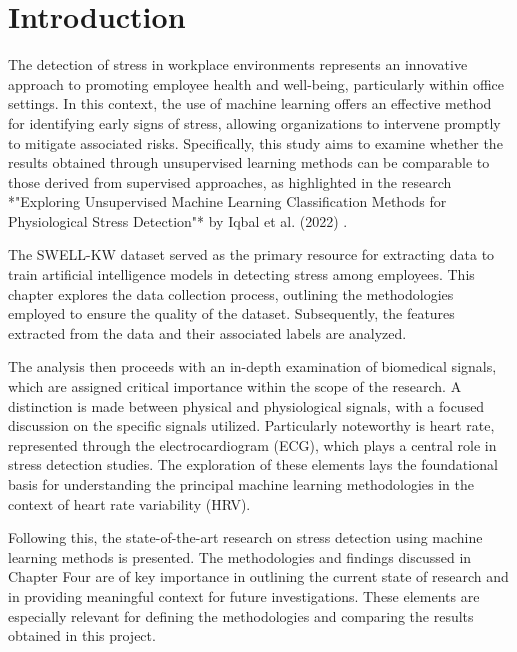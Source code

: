 \chapter{Introduction}

The detection of stress in workplace environments represents an innovative approach to promoting employee health and well-being, particularly within office settings. In this context, the use of machine learning offers an effective method for identifying early signs of stress, allowing organizations to intervene promptly to mitigate associated risks. Specifically, this study aims to examine whether the results obtained through unsupervised learning methods can be comparable to those derived from supervised approaches, as highlighted in the research *"Exploring Unsupervised Machine Learning Classification Methods for Physiological Stress Detection"* by Iqbal et al. (2022) \cite{iqbal2022exploring}.

\vspace{0.5cm}

The SWELL-KW dataset served as the primary resource for extracting data to train artificial intelligence models in detecting stress among employees. This chapter explores the data collection process, outlining the methodologies employed to ensure the quality of the dataset. Subsequently, the features extracted from the data and their associated labels are analyzed.

\vspace{0.5cm}

The analysis then proceeds with an in-depth examination of biomedical signals, which are assigned critical importance within the scope of the research. A distinction is made between physical and physiological signals, with a focused discussion on the specific signals utilized. Particularly noteworthy is heart rate, represented through the electrocardiogram (ECG), which plays a central role in stress detection studies. The exploration of these elements lays the foundational basis for understanding the principal machine learning methodologies in the context of heart rate variability (HRV).

\vspace{0.5cm}

Following this, the state-of-the-art research on stress detection using machine learning methods is presented. The methodologies and findings discussed in Chapter Four are of key importance in outlining the current state of research and in providing meaningful context for future investigations. These elements are especially relevant for defining the methodologies and comparing the results obtained in this project.

